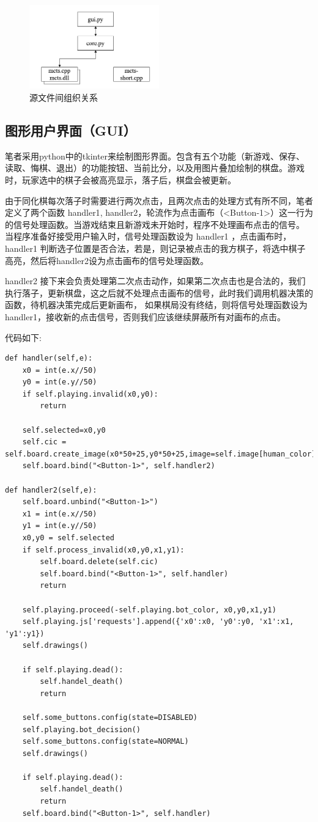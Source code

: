 \documentclass[12pt]{ctexart}
\begin{document}
	\begin{figure}[H]
		\centering
		\includegraphics[width = 0.5\textwidth]{graph.png}
		\caption{源文件间组织关系}
	\end{figure}

	\subsection{图形用户界面（GUI）}
	笔者采用python中的tkinter来绘制图形界面。包含有五个功能（新游戏、保存、读取、悔棋、退出）的功能按钮、当前比分，以及用图片叠加绘制的棋盘。游戏时，玩家选中的棋子会被高亮显示，落子后，棋盘会被更新。

	由于同化棋每次落子时需要进行两次点击，且两次点击的处理方式有所不同，笔者定义了两个函数 \textsf{handler1}, \textsf{handler2}，轮流作为点击画布（\textsf{<Button-1>}）这一行为的信号处理函数。当游戏结束且新游戏未开始时，程序不处理画布点击的信号。
	当程序准备好接受用户输入时，信号处理函数设为 \textsf{handler1} ，点击画布时，\textsf{handler1} 判断选子位置是否合法，若是，则记录被点击的我方棋子，将选中棋子高亮，然后将\textsf{handler2}设为点击画布的信号处理函数。

	\textsf{handler2} 接下来会负责处理第二次点击动作，如果第二次点击也是合法的，我们执行落子，更新棋盘，这之后就不处理点击画布的信号，此时我们调用机器决策的函数，待机器决策完成后更新画布，
	如果棋局没有终结，则将信号处理函数设为\textsf{handler1}，接收新的点击信号，否则我们应该继续屏蔽所有对画布的点击。

	代码如下:
	\newpage

	\begin{lstlisting}
def handler(self,e):
	x0 = int(e.x//50)
	y0 = int(e.y//50)
	if self.playing.invalid(x0,y0):
		return

	self.selected=x0,y0
	self.cic = self.board.create_image(x0*50+25,y0*50+25,image=self.image[human_color])
	self.board.bind("<Button-1>", self.handler2)

def handler2(self,e):
	self.board.unbind("<Button-1>")
	x1 = int(e.x//50)
	y1 = int(e.y//50)
	x0,y0 = self.selected
	if self.process_invalid(x0,y0,x1,y1):
		self.board.delete(self.cic)
		self.board.bind("<Button-1>", self.handler)
		return

	self.playing.proceed(-self.playing.bot_color, x0,y0,x1,y1)
	self.playing.js['requests'].append({'x0':x0, 'y0':y0, 'x1':x1, 'y1':y1})
	self.drawings()

	if self.playing.dead(): 
		self.handel_death()
		return

	self.some_buttons.config(state=DISABLED)
	self.playing.bot_decision()
	self.some_buttons.config(state=NORMAL)
	self.drawings()
	
	if self.playing.dead():
		self.handel_death()
		return
	self.board.bind("<Button-1>", self.handler)
	\end{lstlisting}
\end{document}
